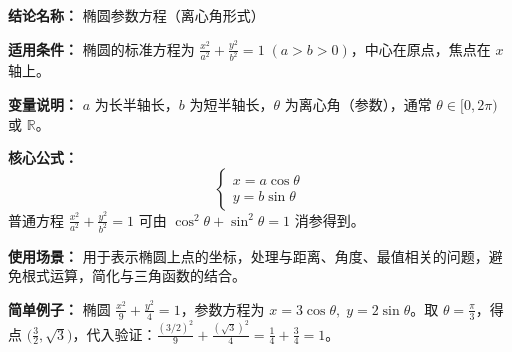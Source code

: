 \textbf{结论名称：} 椭圆参数方程（离心角形式）

\textbf{适用条件：} 椭圆的标准方程为 \(\frac{x^{2}}{a^{2}}+\frac{y^{2}}{b^{2}}=1\;(a>b>0)\)，中心在原点，焦点在 \(x\) 轴上。

\textbf{变量说明：} \(a\) 为长半轴长，\(b\) 为短半轴长，\(\theta\) 为离心角（参数），通常 \(\theta\in[0,2\pi)\) 或 \(\mathbb{R}\)。

\textbf{核心公式：} \[ \boxed{\begin{cases} x = a\cos\theta \\ y = b\sin\theta \end{cases}} \] 普通方程 \(\frac{x^{2}}{a^{2}}+\frac{y^{2}}{b^{2}}=1\) 可由 \(\cos^{2}\theta+\sin^{2}\theta=1\) 消参得到。

\textbf{使用场景：} 用于表示椭圆上点的坐标，处理与距离、角度、最值相关的问题，避免根式运算，简化与三角函数的结合。

\textbf{简单例子：} 椭圆 \(\frac{x^{2}}{9}+\frac{y^{2}}{4}=1\)，参数方程为 \(x=3\cos\theta,\;y=2\sin\theta\)。取 \(\theta=\frac{\pi}{3}\)，得点 \(\bigl(\frac{3}{2},\sqrt{3}\bigr)\)，代入验证：\(\frac{(3/2)^{2}}{9}+\frac{(\sqrt{3})^{2}}{4}=\frac{1}{4}+\frac{3}{4}=1\)。